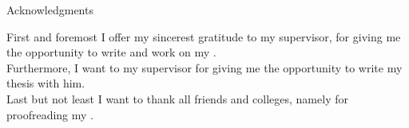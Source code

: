 \thispagestyle{empty}

\vspace*{20mm}

\begin{center}
{ Acknowledgments}
\end{center}

\vspace{10mm}

\noindent First and foremost I offer my sincerest gratitude to my supervisor, \getSupervisor{} for giving me the opportunity
to write and work on my \getDoctypeShort{}. \\

\noindent Furthermore, I want to my supervisor \getAdvisor{} for giving me the opportunity to write my thesis with him. \\

\noindent Last but not least I want to thank all friends and colleges, namely \getProofReaders{} for
proofreading my \getDoctypeShort{}.


\cleardoublepage{}

